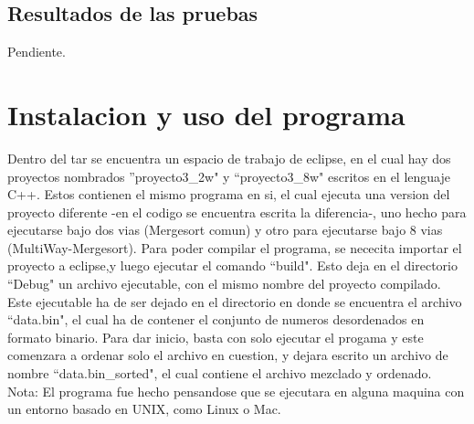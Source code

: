 \documentclass[11pt]{article}
\begin{document}
\subsection{Resultados de las pruebas}
Pendiente.

\section{Instalacion y uso del programa}
Dentro del tar se encuentra un espacio de trabajo de eclipse, en el cual hay dos proyectos nombrados  ''proyecto3\_2w" y ``proyecto3\_8w" escritos en el lenguaje C++. Estos contienen el mismo programa en si, el cual ejecuta una version del proyecto diferente -en el codigo se encuentra escrita la diferencia-, uno hecho para ejecutarse bajo dos vias (Mergesort comun) y otro para ejecutarse bajo 8 vias (MultiWay-Mergesort). Para poder compilar el programa, se nececita importar el proyecto a eclipse,y luego ejecutar el comando ``build". Esto deja en el directorio ``Debug" un archivo ejecutable, con el mismo nombre del proyecto compilado. Este ejecutable ha de ser dejado en el directorio en donde se encuentra el archivo ``data.bin", el cual ha de contener el conjunto de numeros desordenados en formato binario. Para dar inicio, basta con solo ejecutar el progama y este comenzara a ordenar solo el archivo en cuestion, y dejara escrito un archivo de nombre ``data.bin\_sorted", el cual contiene el archivo mezclado y ordenado.\\

Nota: El programa fue hecho pensandose que se ejecutara en alguna maquina con un entorno basado en UNIX, como Linux o Mac.
\end{document}
